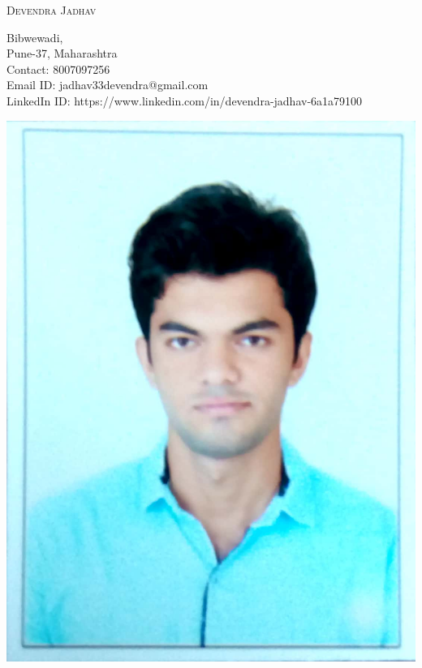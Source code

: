 \documentclass[10pt]{article}
\begin{document}
\begin{center}
\Huge{\textsc{Devendra Jadhav}}\bigskip
\end{center} 


\begin{flushleft}
Bibwewadi, \\
Pune-37, Maharashtra \\
Contact: 8007097256 \\
Email ID: jadhav33devendra@gmail.com \\
LinkedIn ID: https://www.linkedin.com/in/devendra-jadhav-6a1a79100
\end{flushleft}

\begin{flushleft}
	\includegraphics[scale=0.10]{dev.jpg}
\end{flushleft}
\end{document}

